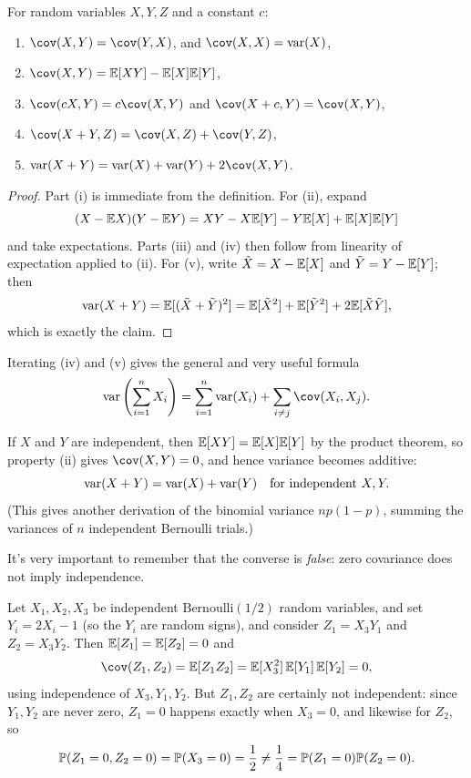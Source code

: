 \documentclass[a4paper]{scrartcl}
\begin{document}
\begin{proposition}
	For random variables $X, Y, Z$ and a constant $c$:
	\begin{enumerate}[label=(\roman*)]
		\item $\cov(X, Y) = \cov(Y, X)$, and $\cov(X, X) = \var(X)$,
		\item $\cov(X, Y) = \EE[XY] - \EE[X]\EE[Y]$,
		\item $\cov(cX, Y) = c\cov(X, Y)$ and $\cov(X + c, Y) = \cov(X, Y)$,
		\item $\cov(X + Y, Z) = \cov(X, Z) + \cov(Y, Z)$,
		\item $\var(X + Y) = \var(X) + \var(Y) + 2\cov(X, Y)$.
	\end{enumerate}
\end{proposition}
\begin{proof}
	Part (i) is immediate from the definition. For (ii), expand
	$$
	(X - \mathbb{E} X)(Y - \mathbb{E} Y) = XY - X \mathbb{E}[Y] - Y \mathbb{E}[X] + \mathbb{E}[X]\mathbb{E}[Y]
	$$
	and take expectations. Parts (iii) and (iv) then follow from linearity of expectation applied to (ii). For (v), write $\tilde{X} = X - \mathbb{E}[X]$ and $\tilde{Y} = Y - \mathbb{E}[Y]$; then
	$$
	\operatorname{var}(X + Y) = \mathbb{E}[(\tilde X + \tilde Y)^2] = \mathbb{E}[\tilde X^2] + \mathbb{E}[\tilde Y^2] + 2\mathbb{E}[\tilde X \tilde Y],
	$$
	which is exactly the claim.
\end{proof}

Iterating (iv) and (v) gives the general and very useful formula
$$
\var\left(\sum_{i = 1}^{n} X_i\right) = \sum_{i = 1}^{n} \var(X_i) + \sum_{i \neq j} \cov(X_i, X_j).
$$

If $X$ and $Y$ are independent, then $\mathbb{E}[XY] = \mathbb{E}[X]\mathbb{E}[Y]$ by the product theorem, so property (ii) gives $\cov(X, Y) = 0$, and hence variance becomes additive:
$$
\operatorname{var}(X + Y) = \operatorname{var}(X) + \operatorname{var}(Y) \quad \text{for independent } X, Y.
$$
(This gives another derivation of the binomial variance $np(1-p)$, summing the variances of $n$ independent Bernoulli trials.)

It's very important to remember that the converse is \emph{false}: zero covariance does not imply independence.

\begin{example}
	Let $X_1, X_2, X_3$ be independent $\mathrm{Bernoulli}(1/2)$ random variables, and set $Y_i = 2X_i - 1$ (so the $Y_i$ are random signs), and consider $Z_1 = X_3 Y_1$ and $Z_2 = X_3 Y_2$. Then $\mathbb{E}[Z_1] = \mathbb{E}[Z_2] = 0$ and
	$$
	\cov(Z_1, Z_2) = \EE[Z_1 Z_2] = \EE[X_3^2]\,\EE[Y_1]\,\EE[Y_2] = 0,
	$$
	using independence of $X_3, Y_1, Y_2$. But $Z_1, Z_2$ are certainly not independent: since $Y_1, Y_2$ are never zero, $Z_1 = 0$ happens exactly when $X_3 = 0$, and likewise for $Z_2$, so
	$$
	\mathbb{P}(Z_1 = 0, Z_2 = 0) = \mathbb{P}(X_3 = 0) = \frac{1}{2} \neq \frac{1}{4} = \mathbb{P}(Z_1 = 0)\mathbb{P}(Z_2 = 0).
	$$
\end{example}
\end{document}
